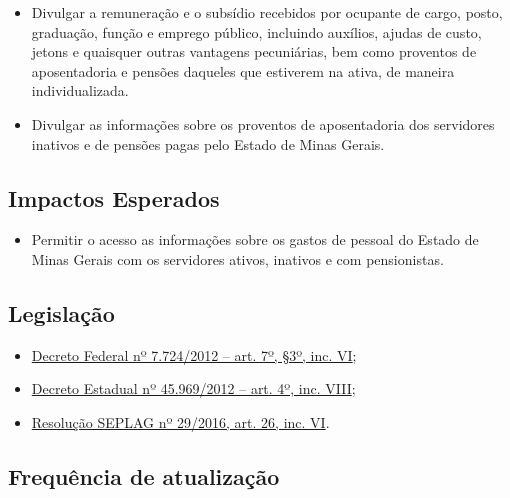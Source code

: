 \documentclass[
]{book}
\providecommand{\tightlist}{%
  \setlength{\itemsep}{0pt}\setlength{\parskip}{0pt}}
\begin{document}
\begin{itemize}
\tightlist
\item
  Divulgar a remuneração e o subsídio recebidos por ocupante de cargo, posto, graduação, função e emprego público, incluindo auxílios, ajudas de custo, jetons e quaisquer outras vantagens pecuniárias, bem como proventos de aposentadoria e pensões daqueles que estiverem na ativa, de maneira individualizada.
\item
  Divulgar as informações sobre os proventos de aposentadoria dos servidores inativos e de pensões pagas pelo Estado de Minas Gerais.
\end{itemize}

\hypertarget{impactos-esperados-8}{%
\subsection{Impactos Esperados}\label{impactos-esperados-8}}

\begin{itemize}
\tightlist
\item
  Permitir o acesso as informações sobre os gastos de pessoal do Estado de Minas Gerais com os servidores ativos, inativos e com pensionistas.
\end{itemize}

\hypertarget{legislauxe7uxe3o-8}{%
\subsection{Legislação}\label{legislauxe7uxe3o-8}}

\begin{itemize}
\tightlist
\item
  \href{http://www.planalto.gov.br/ccivil_03/_ato2011-2014/2012/decreto/d7724.htm\#art7}{Decreto Federal nº 7.724/2012 -- art. 7º, §3º, inc. VI};
\item
  \href{https://www.almg.gov.br/consulte/legislacao/completa/completa.html?tipo=DEC\&num=45969\&ano=2012}{Decreto Estadual nº 45.969/2012 -- art. 4º, inc. VIII};
\item
  \href{http://www.planejamento.mg.gov.br/sites/default/files/documentos/resolucao_sitios_seplag_29_de_05_07_2016_1.pdf}{Resolução SEPLAG nº 29/2016, art. 26, inc. VI}.
\end{itemize}

\hypertarget{frequuxeancia-de-atualizauxe7uxe3o-7}{%
\subsection{Frequência de atualização}\label{frequuxeancia-de-atualizauxe7uxe3o-7}}
\end{document}
